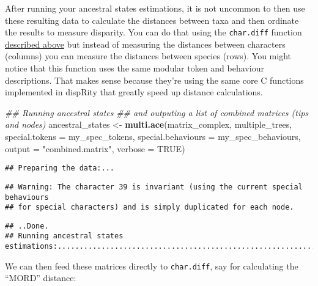\documentclass[
]{book}
\newenvironment{Shaded}{\begin{snugshade}}{\end{snugshade}}
\newcommand{\CommentTok}[1]{\textcolor[rgb]{0.56,0.35,0.01}{\textit{#1}}}
\newcommand{\DataTypeTok}[1]{\textcolor[rgb]{0.13,0.29,0.53}{#1}}
\newcommand{\KeywordTok}[1]{\textcolor[rgb]{0.13,0.29,0.53}{\textbf{#1}}}
\newcommand{\NormalTok}[1]{#1}
\newcommand{\OtherTok}[1]{\textcolor[rgb]{0.56,0.35,0.01}{#1}}
\newcommand{\StringTok}[1]{\textcolor[rgb]{0.31,0.60,0.02}{#1}}
\begin{document}
After running your ancestral states estimations, it is not uncommon to then use these resulting data to calculate the distances between taxa and then ordinate the results to measure disparity.
You can do that using the \texttt{char.diff} function \protect\hyperlink{char.diff}{described above} but instead of measuring the distances between characters (columns) you can measure the distances between species (rows).
You might notice that this function uses the same modular token and behaviour descriptions.
That makes sense because they're using the same core C functions implemented in dispRity that greatly speed up distance calculations.

\begin{Shaded}
\begin{Highlighting}[]
\CommentTok{\#\# Running ancestral states}
\CommentTok{\#\# and outputing a list of combined matrices (tips and nodes)}
\NormalTok{ancestral\_states \textless{}{-}}\StringTok{ }\KeywordTok{multi.ace}\NormalTok{(matrix\_complex, multiple\_trees,}
                              \DataTypeTok{special.tokens =}\NormalTok{ my\_spec\_tokens,}
                              \DataTypeTok{special.behaviours =}\NormalTok{ my\_spec\_behaviours,}
                              \DataTypeTok{output =} \StringTok{"combined.matrix"}\NormalTok{,}
                              \DataTypeTok{verbose =} \OtherTok{TRUE}\NormalTok{)}
\end{Highlighting}
\end{Shaded}

\begin{verbatim}
## Preparing the data:...
\end{verbatim}

\begin{verbatim}
## Warning: The character 39 is invariant (using the current special behaviours
## for special characters) and is simply duplicated for each node.
\end{verbatim}

\begin{verbatim}
## ..Done.
## Running ancestral states estimations:.....................................................................................................................................................................................................................................................Done.
\end{verbatim}

We can then feed these matrices directly to \texttt{char.diff}, say for calculating the ``MORD'' distance:
\end{document}
